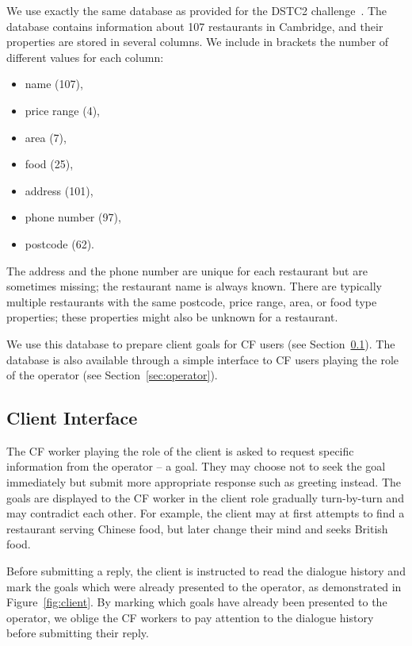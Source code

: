 \documentclass[runningheads,a4paper]{llncs}
\def\OD#1{{\color{darkgreen}OD: \it #1}}
\begin{document}
We use exactly the same database as provided for the DSTC2 challenge~\cite{henderson2014dstc2}.
The database contains information about 107 restaurants in Cambridge, and their properties are stored in several columns.
We include in brackets the number of different values for each column:
\vspace{-0.50em}
\begin{itemize}  %
    \item name (107),
    \item price range (4),
    \item area (7),
    \item food (25),
    \item address (101),
    \item phone number (97),
    \item postcode (62).
\end{itemize}
\vspace{-0.50em}

The address and the phone number are unique for each restaurant but are sometimes missing; the restaurant name is always known. 
There are typically multiple restaurants with the same postcode, price range, area, or food type properties; these properties might also be unknown for a restaurant.

We use this database to prepare client goals for CF users (see Section~\ref{sec:client}).
The database is also available through a simple interface to CF users playing the role of the operator (see Section~\ref{sec:operator}).

\vspace{-1.00em}
\subsection{Client Interface}
\label{sec:client}

The CF worker playing the role of the client is asked to request specific information from the operator – a goal.
They may choose not to seek the goal immediately but submit more appropriate response such as greeting instead.
The goals are displayed to the CF worker in the client role gradually turn-by-turn and may contradict each other.
For example, the client may at first attempts to find a restaurant serving Chinese food, but later change their mind and seeks British food.

Before submitting a reply, the client is instructed to read the dialogue history and mark the goals which were already presented to the operator, as demonstrated in Figure~\ref{fig:client}.
By marking which goals have already been presented to the operator, we oblige the CF workers to pay attention to the dialogue history before submitting their reply.
\end{document}
